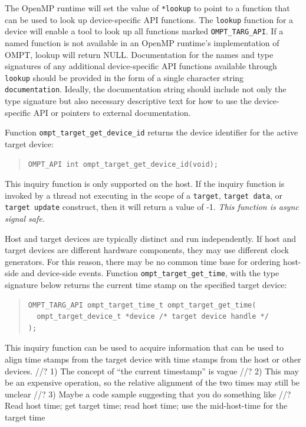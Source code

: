 \documentclass{article}
\begin{document}
The OpenMP runtime will set the value of \verb|*lookup| to point to a function that can be used to look up device-specific API functions.  The \verb|lookup| function for a device will enable a tool to look up all functions marked \verb|OMPT_TARG_API|.  If a named function is not available in an OpenMP runtime's implementation of OMPT, lookup will return NULL. Documentation for the names and type signatures of any additional device-specific API functions available through \verb|lookup| should be provided in the form of a single character string \verb|documentation|. Ideally, the documentation string should include not only the type signature but also necessary descriptive text for how to use the device-specific API or pointers to external documentation.

Function \verb|ompt_target_get_device_id| returns the device identifier for the active target device:
\begin{quote}
\begin{verbatim}
OMPT_API int ompt_target_get_device_id(void);
\end{verbatim}
\end{quote}
This inquiry function is only supported on the host. If the inquiry function is invoked by a thread not executing in the scope of a {\tt target}, {\tt target data}, or {\tt target update} construct, then it will return a value of -1. {\it This function is async signal safe.}

Host and target devices are typically distinct and run independently. If 
host and target devices are different hardware components, they may 
use different clock generators. For this reason,  there may be no common time base for ordering host-side and device-side events.
Function \verb|ompt_target_get_time|, with the type signature below returns the current time stamp on the specified target device:
\begin{quote}
\begin{verbatim}
OMPT_TARG_API ompt_target_time_t ompt_target_get_time(
  ompt_target_device_t *device /* target device handle */
);
\end{verbatim}
\end{quote}
This inquiry function can be used
to acquire information that can be used to align time stamps from the target device with time
stamps from the host or other devices.
//? 1) The concept of ``the current timestamp'' is vague
//? 2) This may be an expensive operation, so the relative alignment of the two times may still be unclear
//? 3) Maybe a code sample suggesting that you do something like
//?    Read host time; get target time; read host time; use the mid-host-time for the target time
\end{document}
